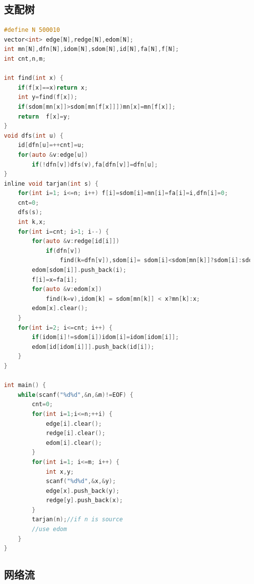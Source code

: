 \documentclass[UTF8,a4paper,titlepage]{ctexart}
\begin{document}
\subsection{支配树}
\begin{lstlisting}[language=C]
#define N 500010
vector<int> edge[N],redge[N],edom[N];
int mn[N],dfn[N],idom[N],sdom[N],id[N],fa[N],f[N];
int cnt,n,m;

int find(int x) {
    if(f[x]==x)return x;
    int y=find(f[x]);
    if(sdom[mn[x]]>sdom[mn[f[x]]])mn[x]=mn[f[x]];
    return  f[x]=y;
}
void dfs(int u) {
    id[dfn[u]=++cnt]=u;
    for(auto &v:edge[u])
        if(!dfn[v])dfs(v),fa[dfn[v]]=dfn[u];
}
inline void tarjan(int s) {
    for(int i=1; i<=n; i++) f[i]=sdom[i]=mn[i]=fa[i]=i,dfn[i]=0;
    cnt=0;
    dfs(s);
    int k,x;
    for(int i=cnt; i>1; i--) {
        for(auto &v:redge[id[i]])
            if(dfn[v])
                find(k=dfn[v]),sdom[i]= sdom[i]<sdom[mn[k]]?sdom[i]:sdom[mn[k]];
        edom[sdom[i]].push_back(i);
        f[i]=x=fa[i];
        for(auto &v:edom[x])
            find(k=v),idom[k] = sdom[mn[k]] < x?mn[k]:x;
        edom[x].clear();
    }
    for(int i=2; i<=cnt; i++) {
        if(idom[i]!=sdom[i])idom[i]=idom[idom[i]];
        edom[id[idom[i]]].push_back(id[i]);
    }
}

int main() {
    while(scanf("%d%d",&n,&m)!=EOF) {
        cnt=0;
        for(int i=1;i<=n;++i) {
            edge[i].clear();
            redge[i].clear();
            edom[i].clear();
        }
        for(int i=1; i<=m; i++) {
            int x,y;
            scanf("%d%d",&x,&y);
            edge[x].push_back(y);
            redge[y].push_back(x);
        }
        tarjan(n);//if n is source
        //use edom
    }
}
\end{lstlisting}

\subsection{网络流}
\end{document}

